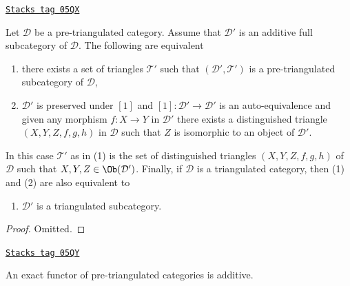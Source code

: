 \begin{lemma}
\label{derived-lemma-triangulated-subcategory}
\href{https://stacks.math.columbia.edu/tag/05QX}{\texttt{Stacks tag 05QX}}

Let $\mathcal{D}$ be a pre-triangulated category.
Assume that $\mathcal{D}'$ is an additive full subcategory of $\mathcal{D}$.
The following are equivalent
\begin{enumerate}
\item there exists a set of triangles $\mathcal{T}'$ such that
$(\mathcal{D}', \mathcal{T}')$ is a pre-triangulated subcategory
of $\mathcal{D}$,
\item $\mathcal{D}'$ is preserved under $[1]$ and
$[1] : \mathcal{D}' \to \mathcal{D}'$ is an auto-equivalence and
given any morphism $f : X \to Y$ in $\mathcal{D}'$ there exists
a distinguished triangle $(X, Y, Z, f, g, h)$ in $\mathcal{D}$
such that $Z$ is isomorphic to an object of $\mathcal{D}'$.
\end{enumerate}
In this case $\mathcal{T}'$ as in (1) is the set of distinguished triangles
$(X, Y, Z, f, g, h)$ of $\mathcal{D}$ such that
$X, Y, Z \in \Ob(\mathcal{D}')$. Finally, if $\mathcal{D}$
is a triangulated category, then (1) and (2) are also equivalent to
\begin{enumerate}
\item[(3)] $\mathcal{D}'$ is a triangulated subcategory.
\end{enumerate}
\end{lemma}

\begin{proof}
Omitted.
\end{proof}

\begin{lemma}
\label{derived-lemma-exact-functor-additive}
\href{https://stacks.math.columbia.edu/tag/05QY}{\texttt{Stacks tag 05QY}}

An exact functor of pre-triangulated categories is additive.
\end{lemma}


